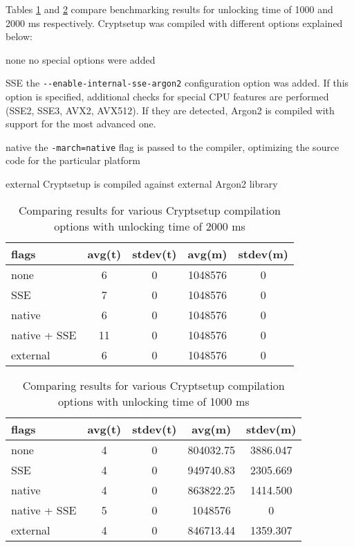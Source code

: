 \documentclass[nolof]{fithesis3}
\begin{document}
\FloatBarrier

Tables \ref{tab:comp2000} and \ref{tab:comp1000} compare benchmarking results for unlocking time of 1000 and 2000 ms respectively. Cryptsetup was compiled with different options explained below:

\begin{description}
\item{none} no special options were added

\item{SSE} the \verb+--enable-internal-sse-argon2+ configuration option was added. If this option is specified, additional checks for special CPU features are performed (SSE2, SSE3, AVX2, AVX512). If they are detected, Argon2 is compiled with support for the most advanced one.

\item{native} the \verb+-march=native+ flag is passed to the compiler, optimizing the source code for the particular platform

\item{external} Cryptsetup is compiled against external Argon2 library
\end{description}

\noindent
\begin{table}
\caption{Comparing results for various Cryptsetup compilation options with unlocking time of 2000 ms}
\label{tab:comp2000}
\begin{tabularx}{\textwidth}{| l | c | c | c | c |}
\hline
flags & avg(t) & stdev(t) & avg(m) & stdev(m)\\
\hline
none & 6 & 0 & 1048576 & 0\\
\hline
SSE & 7 & 0 & 1048576 & 0\\
\hline
native & 6 & 0 & 1048576 & 0\\
\hline
native + SSE & 11 & 0 & 1048576 & 0\\
\hline
external & 6 & 0 & 1048576 & 0\\
\hline
\end{tabularx}
\end{table}

\noindent
\begin{table}
\caption{Comparing results for various Cryptsetup compilation options with unlocking time of 1000 ms}
\label{tab:comp1000}
\begin{tabularx}{\textwidth}{| l | c | c | c | c |}
\hline
flags & avg(t) & stdev(t) & avg(m) & stdev(m)\\
\hline
none & 4 & 0 & 804032.75 & 3886.047\\
\hline
SSE & 4 & 0 & 949740.83 & 2305.669\\
\hline
native & 4 & 0 & 863822.25 & 1414.500\\
\hline
native + SSE & 5 & 0 & 1048576 & 0\\
\hline
external & 4 & 0 & 846713.44 & 1359.307\\
\hline
\end{tabularx}
\end{table}
\end{document}

